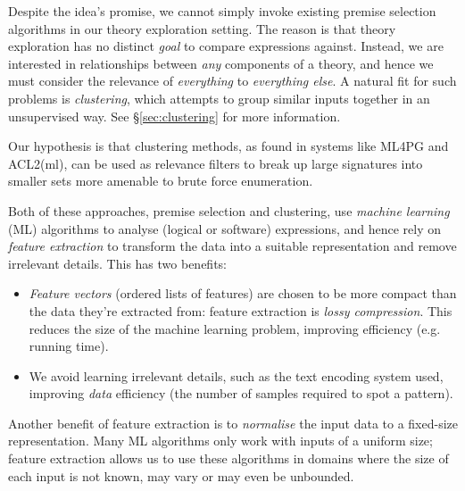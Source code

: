 Despite the idea's promise, we cannot simply invoke existing premise selection algorithms in our theory exploration setting. The reason is that theory exploration has no distinct \emph{goal} to compare expressions against. Instead, we are interested in relationships between \emph{any} components of a theory, and hence we must consider the relevance of \emph{everything} to \emph{everything else}. \iffalse TODO: every term in the given signature? \fi A natural fit for such problems is \emph{clustering}, which attempts to group similar inputs together in an unsupervised way. See \S \ref{sec:clustering} for more information.

Our hypothesis is that clustering methods, as found in systems like ML4PG and ACL2(ml), can be used as relevance filters to break up large signatures into smaller sets more amenable to brute force enumeration.

\iffalse TODO: Signatures or terms? \fi

\iffalse TODO: I would play up the clustering intelligence. Clustering is not just about breaking up, it is about discovering significant patterns in data. By forgetting this, you make motivation for your work sound too ``small'' \fi

Both of these approaches, premise selection and clustering, use \emph{machine learning} (ML) algorithms to analyse (logical or software) \iffalse TODO: software vs logical expr? \fi expressions, and hence rely on \emph{feature extraction} to transform the data into a suitable representation and remove irrelevant details. This has two benefits:

\begin{itemize}
  \item \emph{Feature vectors} (ordered lists of features) are chosen to be more compact \iffalse TODO: unclear \fi than the data they're extracted from: feature extraction is \emph{lossy compression}. This reduces the size of the machine learning problem, improving efficiency (e.g. running time).
  \item We avoid learning irrelevant details, such as the text encoding system used, improving \emph{data} efficiency (the number of samples required to spot a pattern).
\end{itemize}

Another benefit of feature extraction is to \emph{normalise} the input data to a fixed-size representation. Many ML algorithms only work with inputs of a uniform size; feature extraction allows us to use these algorithms in domains where the size of each input is not known, may vary or may even be unbounded.

